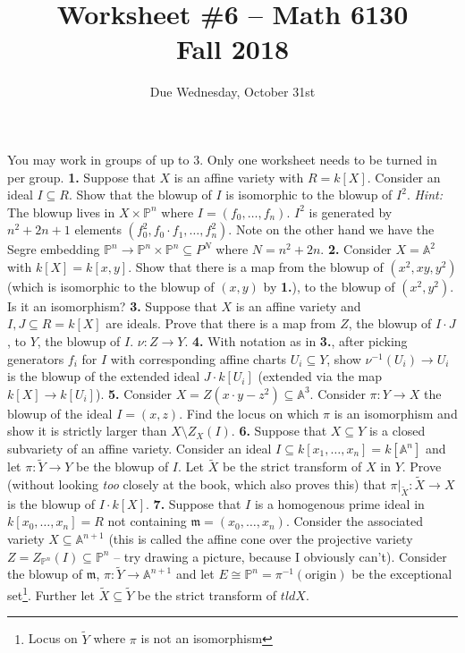 \documentclass[11pt]{amsart}
\theoremstyle{theorem}
\renewcommand{\to}[1][]{\xrightarrow{\ #1\ }}
\newcommand{\bP}{\mathbb{P}}
\newcommand{\bA}{\mathbb{A}}
\newcommand{\tld}{\widetilde}
\newcommand{\fram}{\mathfrak{m}}
\begin{document}
\title{Worksheet \#6 -- Math 6130\\Fall 2018}
\author{Due Wednesday, October 31st}

\maketitle
You may work in groups of up to 3.  Only one worksheet needs to be turned in per group.
\vskip 9pt
\noindent
{\bf 1.}  Suppose that $X$ is an affine variety with $R = k[X]$.  Consider an ideal $I \subseteq R$.  Show that the blowup of $I$ is isomorphic to the blowup of $I^2$.
\vskip 3pt
\emph{Hint:} The blowup lives in $X \times \bP^n$ where $I = (f_0, \dots, f_n)$.  $I^2$ is generated by $n^2 +2n + 1$ elements $(f_0^2, f_0 \cdot f_1, \dots, f_n^2)$.  Note on the other hand we have the Segre embedding $\bP^n \to \bP^n \times \bP^n \subseteq P^{N}$ where $N = n^2 + 2n$.
\vskip 220pt
\noindent
{\bf 2.}  Consider $X = \bA^2$ with $k[X] = k[x,y]$.  Show that there is a map from the blowup of $(x^2, xy, y^2)$ (which is isomorphic to the blowup of $(x,y)$ by {\bf 1.}), to the blowup of $(x^2, y^2)$.  Is it an isomorphism?
\newpage
\noindent
{\bf 3.}  Suppose that $X$ is an affine variety and $I, J \subseteq R = k[X]$ are ideals.  Prove that there is a map from $Z$, the blowup of $I \cdot J$,  to $Y$, the blowup of $I$.  $\nu : Z \to Y$.
\vskip 280pt
\noindent
{\bf 4.}  With notation as in {\bf 3.}, after picking generators $f_i$ for $I$ with corresponding affine charts $U_i \subseteq Y$, show $\nu^{-1} (U_i) \to U_i$ is the blowup of the extended ideal $J \cdot k[U_i]$ (extended via the map $k[X] \to k[U_i]$).
\newpage
\noindent
{\bf 5.}  Consider $X = Z(x\cdot y - z^2) \subseteq \bA^3$.  Consider $\pi : Y \to X$ the blowup of the ideal $I = (x,z)$.  Find the locus on which $\pi$ is an isomorphism and show it is strictly larger than $X \setminus Z_X(I)$.
\vskip 250pt
\noindent
{\bf 6.}  Suppose that $X \subseteq Y$ is a closed subvariety of an affine variety.  Consider an ideal $I \subseteq k[x_1, \dots, x_n] = k[\bA^n]$ and let $\pi : \tld{Y} \to Y$ be the blowup of $I$.  Let $\tld{X}$ be the strict transform of $X$ in $Y$.  Prove (without looking \emph{too} closely at the book, which also proves this) that $\pi|_{\tld X} : \tld{X} \to X$ is the blowup of $I \cdot k[X]$.
\newpage
\noindent
{\bf 7.}  Suppose that $I$ is a homogenous prime ideal in $k[x_0, \dots, x_n] = R$ not containing $\fram = (x_0, \dots, x_n)$.  Consider the associated variety $X \subseteq \bA^{n+1}$ (this is called the affine cone over the projective variety $Z = Z_{\bP^n}(I) \subseteq \bP^n$ -- try drawing a picture, because I obviously can't).  Consider the blowup of $\fram$, $\pi : \tld Y \to \bA^{n+1}$ and let $E \cong \bP^n = \pi^{-1} (\text{origin})$ be the exceptional set\footnote{Locus on $\tld Y$ where $\pi$ is not an isomorphism}.  Further let $\tld X \subseteq \tld Y$ be the strict transform of $tld X$.
\end{document}
